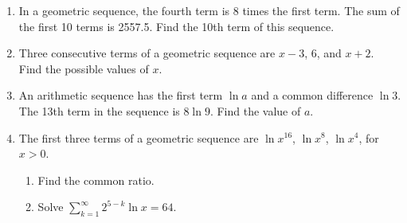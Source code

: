 \documentclass[12pt, oneside]{article}
\begin{document}
\begin{enumerate}
\item In a geometric sequence, the fourth term is 8 times the first term. The sum of the first 10 terms is 2557.5. Find the 10th term of this sequence.
    \begin{flushright}[6]\end{flushright}

\item Three consecutive terms of a geometric sequence are $x-3$, 6, and $x+2$.\\
Find the possible values of $x$.
    \begin{flushright}[6]\end{flushright}

\item An arithmetic sequence has the first term $\ln a$ and a common difference $\ln 3$. The 13th term in the sequence is $8\ln 9$. Find the value of $a$.
    \begin{flushright}[6]\end{flushright}

\item The first three terms of a geometric sequence are $\ln{x^16}$, $\ln{x^8}$, $\ln{x^4}$, for $x>0$.\\
\begin{enumerate}
    \item Find the common ratio.
        \begin{flushright}[3]\end{flushright}
    \item Solve $\displaystyle \sum_{k=1}^{\infty} 2^{5-k} \ln x =64$.
        \begin{flushright}[5]\end{flushright}
    \end{enumerate}


\end{enumerate}
\end{document}
